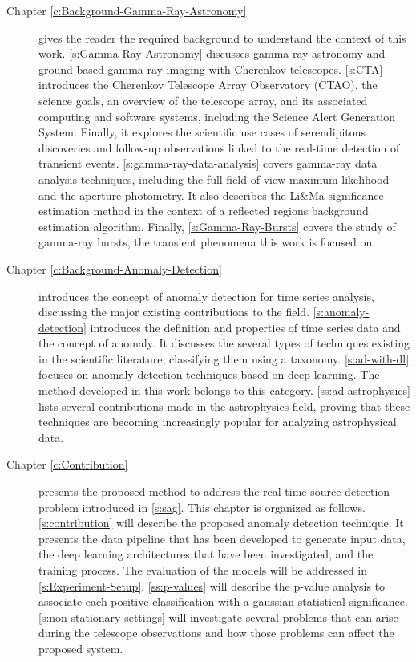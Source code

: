 \begin{description}

  \item[Chapter \ref{c:Background-Gamma-Ray-Astronomy}] gives the reader the required background to understand the context of this work. \autoref{s:Gamma-Ray-Astronomy} discusses gamma-ray astronomy and ground-based gamma-ray imaging with Cherenkov telescopes. \autoref{s:CTA} introduces the Cherenkov Telescope Array Observatory (CTAO), the science goals, an overview of the telescope array, and its associated computing and software systems, including the Science Alert Generation System. Finally, it explores the scientific use cases of serendipitous discoveries and follow-up observations linked to the real-time detection of transient events. \autoref{s:gamma-ray-data-analysis} covers gamma-ray data analysis techniques, including the full field of view maximum likelihood and the aperture photometry. It also describes the Li\&Ma significance estimation method in the context of a reflected regions background estimation algorithm. Finally, \autoref{s:Gamma-Ray-Bursts} covers the study of gamma-ray bursts, the transient phenomena this work is focused on.
  
  \item[Chapter \ref{c:Background-Anomaly-Detection}] introduces the concept of anomaly detection for time series analysis, discussing the major existing contributions to the field. \autoref{s:anomaly-detection} introduces the definition and properties of time series data and the concept of anomaly. It discusses the several types of techniques existing in the scientific literature, classifying them using a taxonomy. \autoref{s:ad-with-dl} focuses on anomaly detection techniques based on deep learning. The method developed in this work belongs to this category. \autoref{ss:ad-astrophysics} lists several contributions made in the astrophysics field, proving that these techniques are becoming increasingly popular for analyzing astrophysical data.


  \item[Chapter \ref{c:Contribution}] presents the proposed method to address the real-time source detection problem introduced in \autoref{s:sag}. This chapter is organized as follows. \autoref{s:contribution} will describe the proposed anomaly detection technique. It presents the data pipeline that has been developed to generate input data, the deep learning architectures that have been investigated, and the training process. The evaluation of the models will be addressed in \autoref{s:Experiment-Setup}. \autoref{ss:p-values} will describe the p-value analysis to associate each positive classification with a gaussian statistical significance. \autoref{s:non-stationary-settings} will investigate several problems that can arise during the telescope observations and how those problems can affect the proposed system.


\end{description}
